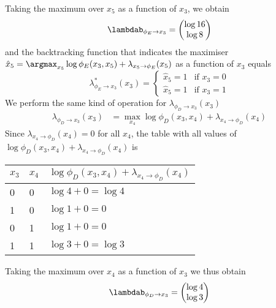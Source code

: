 \begin{exenumerate}
\begin{solution}
      Taking the maximum over $x_5$ as a function of $x_3$, we obtain
      \begin{equation}
        \lambdab_{\phi_E \to x_3} = \begin{pmatrix}
          \log 16\\
          \log 8
        \end{pmatrix}
      \end{equation}
      and the backtracking function that indicates the maximiser
      $\hat{x}_5 = \argmax_{x_5} \log \phi_E(x_3, x_5) + \lambda_{x_5
        \to \phi_E}(x_5)$ as a function of $x_3$ equals
      \begin{equation}
        \lambda^*_{\phi_E \to x_3}(x_3) = \begin{cases}
          \hat{x}_5=1 & \text{if } x_3= 0\\
          \hat{x}_5=1 & \text{if } x_3= 1
          \end{cases}
      \end{equation}
      We perform the same kind of operation for $\lambda_{\phi_D \to x_3}(x_3)$ 
      \begin{align}
        \lambda_{\phi_D \to x_3}(x_3) & = \max_{x_4} \log \phi_D(x_3, x_4) +  \lambda_{x_4 \to \phi_D}(x_4)
      \end{align}
      Since $\lambda_{x_4 \to \phi_D}(x_4)=0$ for all $x_4$, the table with all values of $\log \phi_D(x_3, x_4) +  \lambda_{x_4 \to \phi_D}(x_4)$ is
      \begin{center}
        \begin{tabular}{lll}
          \toprule
          $x_3$ & $x_4$ & $\log \phi_D(x_3, x_4) +  \lambda_{x_4 \to \phi_D}(x_4)$ \\
          \midrule
          0 & 0 &  $\log 4 + 0 = \log 4$ \\
          1 & 0 &  $\log 1 +0 = 0$\\
          0 & 1 &  $\log 1 +0 =0$\\
          1 & 1 &  $\log 3 +0 = \log3$ \\
          \bottomrule
        \end{tabular}
      \end{center}
      Taking the maximum over $x_4$ as a function of $x_3$ we thus obtain
      \begin{equation}
        \lambdab_{\phi_D \to x_3} = \begin{pmatrix}
          \log 4\\
          \log 3
        \end{pmatrix}

\end{equation}
\end{solution}
\end{exenumerate}
